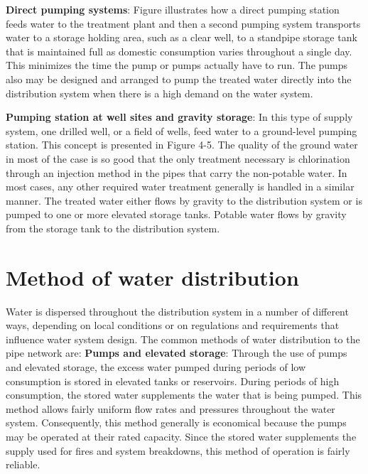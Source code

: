 \begin{figure}
    
\end{figure}

\textbf{Direct pumping systems}: Figure illustrates how a direct pumping station feeds water to the 
treatment plant and then a second pumping system transports water to a storage holding area, 
such as a clear well, to a standpipe storage tank that is maintained full as domestic consumption
varies throughout a single day. This minimizes the time the pump or pumps actually have to run. 
The pumps also may be designed and arranged to pump the treated water directly into the 
distribution system when there is a high demand on the water system. 



\begin{figure}
    
\end{figure}

\textbf{Pumping station at well sites and gravity storage}: In this type of supply system, one drilled
well, or a field of wells, feed water to a ground-level pumping station. This concept is
presented in Figure 4-5. The quality of the ground water in most of the case is so good that 
the only treatment necessary is chlorination through an injection method in the pipes that 
carry the non-potable water. In most cases, any other required water treatment generally is 
handled in a similar manner. The treated water either flows by gravity to the distribution 
system or is pumped to one or more elevated storage tanks. Potable water flows by gravity from 
the storage tank to the distribution system.


\begin{figure}
    
\end{figure}

\section{Method of water distribution}

Water is dispersed throughout the distribution system in a number of different ways, depending 
on local conditions or on regulations and requirements that influence water system design. 
The common methods of water distribution to the pipe network are:
\bigbreak
\textbf{Pumps and elevated storage}: Through the use of pumps and elevated storage, the excess water pumped
during periods of low consumption is stored in elevated tanks or reservoirs. During periods of 
high consumption, the stored water supplements the water that is being pumped. This method allows
fairly uniform flow rates and pressures throughout the water system. Consequently, this method 
generally is economical because the pumps may be operated at their rated capacity. Since the 
stored water supplements the supply used for fires and system breakdowns, this method of operation
is fairly reliable.

